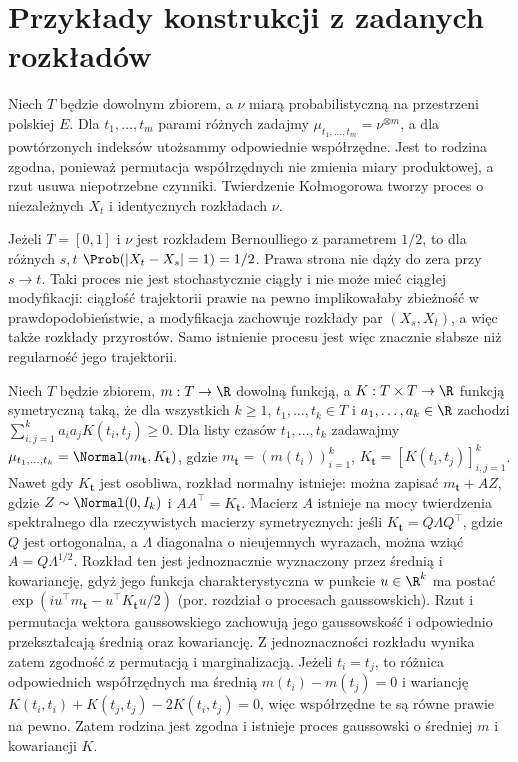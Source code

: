\section{Przykłady konstrukcji z zadanych rozkładów}
\begin{przyklad}
Niech $T$ będzie dowolnym zbiorem, a $\nu$ miarą
probabilistyczną na przestrzeni polskiej $E$.
Dla $t_1,\ldots,t_m$ parami różnych zadajmy
$\mu_{t_1,\ldots,t_m}=\nu^{\otimes m}$,
a dla powtórzonych indeksów utożsammy odpowiednie
współrzędne. Jest to rodzina zgodna, ponieważ
permutacja współrzędnych nie zmienia miary produktowej,
a rzut usuwa niepotrzebne czynniki.
Twierdzenie Kołmogorowa tworzy proces o niezależnych
$X_t$ i identycznych rozkładach $\nu$.

Jeżeli $T=[0,1]$ i $\nu$ jest rozkładem Bernoulliego z
parametrem $1/2$, to dla różnych $s,t$
$\Prob(|X_t-X_s|=1)=1/2$. Prawa strona nie dąży do
zera przy $s\to t$. Taki proces nie jest stochastycznie
ciągły i nie może mieć ciągłej modyfikacji: ciągłość
trajektorii prawie na pewno implikowałaby zbieżność
w prawdopodobieństwie, a modyfikacja zachowuje
rozkłady par $(X_s,X_t)$, a więc także rozkłady przyrostów. Samo
istnienie procesu jest więc znacznie słabsze niż
regularność jego trajektorii.
\end{przyklad}

\begin{przyklad}
Niech $T$ będzie zbiorem, $m:T\to\R$ dowolną funkcją,
a $K:T\times T\to\R$ funkcją symetryczną taką, że
dla wszystkich $k\ge1$, $t_1,\ldots,t_k\in T$
i $a_1,\ldots,a_k\in\R$ zachodzi
$\sum_{i,j=1}^k a_ia_jK(t_i,t_j)\ge0$.
Dla listy czasów $t_1,\ldots,t_k$ zadawajmy
$\mu_{t_1,\ldots,t_k}=\Normal(m_{\mathbf t},K_{\mathbf t})$,
gdzie $m_{\mathbf t}=(m(t_i))_{i=1}^k$,
$K_{\mathbf t}=[K(t_i,t_j)]_{i,j=1}^k$.
Nawet gdy $K_{\mathbf t}$ jest osobliwa, rozkład normalny
istnieje: można zapisać $m_{\mathbf t}+AZ$, gdzie
$Z\sim\Normal(0,I_k)$ i $AA^\top=K_{\mathbf t}$.
Macierz $A$ istnieje na mocy twierdzenia spektralnego
dla rzeczywistych macierzy symetrycznych: jeśli
$K_{\mathbf t}=Q\Lambda Q^\top$, gdzie $Q$ jest ortogonalna,
a $\Lambda$ diagonalna o nieujemnych wyrazach, można
wziąć $A=Q\Lambda^{1/2}$.
Rozkład ten jest jednoznacznie wyznaczony przez średnią
i kowariancję, gdyż jego funkcja charakterystyczna w punkcie
$u\in\R^k$ ma postać
$\exp(iu^\top m_{\mathbf t}-u^\top K_{\mathbf t}u/2)$
(por. rozdział o procesach gaussowskich).
Rzut i permutacja wektora gaussowskiego zachowują jego
gaussowskość i odpowiednio przekształcają średnią
oraz kowariancję. Z jednoznaczności rozkładu wynika
zatem zgodność z permutacją i marginalizacją. Jeżeli $t_i=t_j$, to różnica
odpowiednich współrzędnych ma średnią $m(t_i)-m(t_j)=0$
i wariancję $K(t_i,t_i)+K(t_j,t_j)-2K(t_i,t_j)=0$,
więc współrzędne te są równe prawie na pewno. Zatem rodzina jest zgodna
i istnieje proces gaussowski o średniej $m$ i kowariancji $K$.
\end{przyklad}



